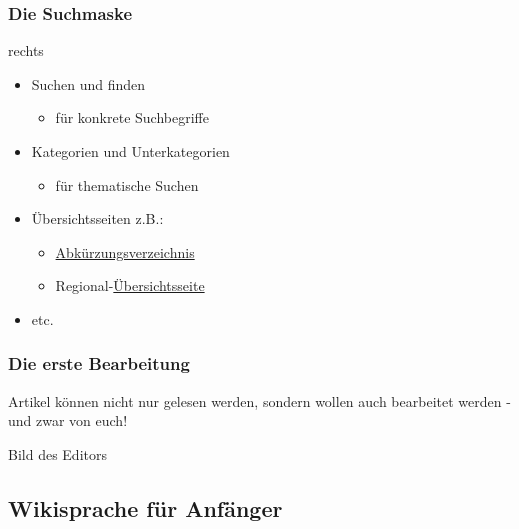 \documentclass{beamer}              %
\begin{document}
\begin{frame}
  \frametitle{Die Suchmaske}

  rechts

  \begin{itemize}[<+->]
    \item Suchen und finden
    \begin{itemize}
      \item für konkrete Suchbegriffe
    \end{itemize}
    \item Kategorien und Unterkategorien
    \begin{itemize}
      \item für thematische Suchen
    \end{itemize}
    \item Übersichtsseiten z.B.:
    \begin{itemize}
      \item \href{http://wiki.stura.htw-dresden.de/index.php/Kategorie:Abk\%C3\%BCrzung}{Abkürzungsverzeichnis}
      \item Regional-\href{http://food.the-empire.de/index.php/Hauptseite}{Übersichtsseite}
    \end{itemize}
    \item etc.
  \end{itemize}
\end{frame}


\begin{frame}
  \frametitle{Die erste Bearbeitung}
  Artikel können nicht nur gelesen werden, sondern wollen auch bearbeitet
  werden - und zwar von euch!

  Bild des Editors

\end{frame}

\subsection{Wikisprache für Anfänger}
\end{document}
